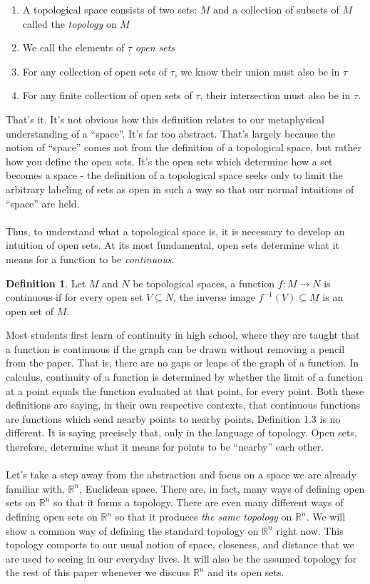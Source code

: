 \documentclass[]{article}
\newcommand\<{\ensuremath{\left\langle}}
\renewcommand\>{\ensuremath{\right\rangle}}
\newcommand{\RR}{\ensuremath{\mathbb{R}}}
\theoremstyle{definition}
\newtheorem{definition}{Definition}[section]
\theoremstyle{definition}
\begin{document}
	\begin{enumerate}[1.]
		\item A topological space consists of two sets: $M$ and a collection of subsets of $M$ called the \textit{topology} on $M$
		\item We call the elements of $\tau$ \textit{open sets}
		\item For any collection of open sets of $\tau$, we know their union must also be in $\tau$
		\item For any finite collection of open sets of $\tau$, their intersection must also be in $\tau$.
	\end{enumerate}
	That's it. It's not obvious how this definition relates to our metaphysical understanding of a ``space''. It's far too abstract. That's largely because the notion of ``space'' comes not from the definition of a topological space, but rather how you define the open sets. It's the open sets which determine how a set becomes a space - the definition of a topological space seeks only to limit the arbitrary labeling of sets as open in such a way so that our normal intuitions of ``space'' are held.\\
	\\
	Thus, to understand what a topological space is, it is necessary to develop an intuition of open sets. At its most fundamental, open sets determine what it means for a function to be \textit{continuous}.
	\begin{definition}
		Let $M$ and $N$ be topological spaces, a function $f : M \to N$ is continuous if for every open set $V \subseteq N$, the inverse image $f^{-1}(V) \subseteq M$ is an open set of $M$.
	\end{definition} 
	Most students first learn of continuity in high school, where they are taught that a function is continuous if the graph can be drawn without removing a pencil from the paper. That is, there are no gaps or leaps of the graph of a function. In calculus, continuity of a function is determined by whether the limit of a function at a point equals the function evaluated at that point, for every point. Both these definitions are saying, in their own respective contexts, that continuous functions are functions which send nearby points to nearby points. Definition 1.3 is no different. It is saying precisely that, only in the language of topology. Open sets, therefore, determine what it means for points to be ``nearby'' each other.\\
	\\
	Let's take a step away from the abstraction and focus on a space we are already familiar with, $\RR^n$, Euclidean space. There are, in fact, many ways of defining open sets on $\RR^n$ so that it forms a topology. There are even many different ways of defining open sets on $\RR^n$ so that it produces \textit{the same topology} on $\RR^n$. We will show a common way of defining the standard topology on $\RR^n$ right now. This topology comports to our usual notion of space, closeness, and distance that we are used to seeing in our everyday lives. It will also be the assumed topology for the rest of this paper whenever we discuss $\RR^n$ and its open sets.
\end{document}
